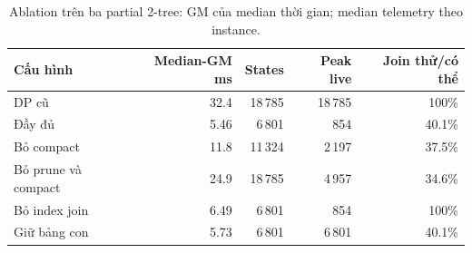 \begin{table}[htbp]
\centering
\small
\setlength{\tabcolsep}{4pt}
\caption{Ablation trên ba partial 2-tree: GM của median thời gian; median telemetry theo instance.}
\label{tab:ablation}
\begin{tabular}{lrrrr}
\toprule
Cấu hình & Median-GM ms & States & Peak live & Join thử/có thể \\
\midrule
DP cũ & 32.4 & 18\,785 & 18\,785 & 100\% \\
Đầy đủ & 5.46 & 6\,801 & 854 & 40.1\% \\
Bỏ compact & 11.8 & 11\,324 & 2\,197 & 37.5\% \\
Bỏ prune và compact & 24.9 & 18\,785 & 4\,957 & 34.6\% \\
Bỏ index join & 6.49 & 6\,801 & 854 & 100\% \\
Giữ bảng con & 5.73 & 6\,801 & 6\,801 & 40.1\% \\
\bottomrule
\end{tabular}
\end{table}

